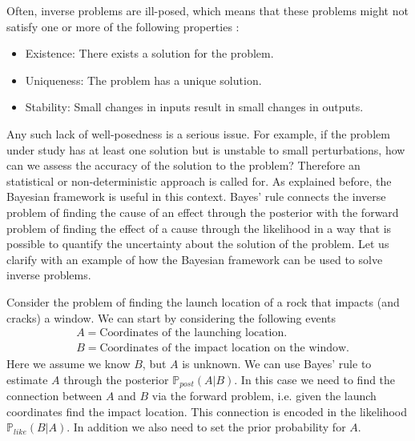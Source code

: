 \documentclass[12pt]{book}
\newcommand{\post}{\mathbb{P}_{post}}
\newcommand{\like}{\mathbb{P}_{like}}
\begin{document}
Often, inverse problems
are ill-posed, which means
that these problems might  not satisfy one or more of the following properties \cite{lebedev2012functional}:

\begin{itemize}
\item Existence: There exists a solution for the problem.
\item Uniqueness: The problem has a unique solution.
\item Stability: Small changes in inputs result in small changes in outputs.
\end{itemize}
Any such lack of well-posedness is a serious issue. For example, if the problem under study has at least one solution
but is unstable to small perturbations, how can we assess the accuracy of the solution to 
the problem?
Therefore an statistical or non-deterministic approach is called for. As explained before, the Bayesian framework 
is useful in this context. Bayes' rule connects the inverse problem  of finding the cause
of an effect through the posterior with the forward problem of finding the effect of a cause
through the likelihood in a way that is possible to quantify the uncertainty about the solution
of the problem. Let us  clarify with an example of how the Bayesian framework can be used to solve inverse problems. 
\newline

Consider the problem of finding the launch location of a rock that impacts (and cracks) a window. 
We can start by considering the following events
\begin{align*}
& A=\text{Coordinates of the launching location}.\\
& B= \text{Coordinates of the impact location on the window}.
\end{align*}
Here we assume we know $B$, but $A$ is unknown. We can use Bayes' rule to estimate $A$ through
the posterior $\post(A|B)$. In this case
we need to find the connection between $A$ and $B$ via the forward problem, i.e. given 
the launch coordinates find the impact location. This connection is encoded in the likelihood $\like(B|A)$.
In addition we also need to set the prior probability for $A$. 
\newline
\end{document}
